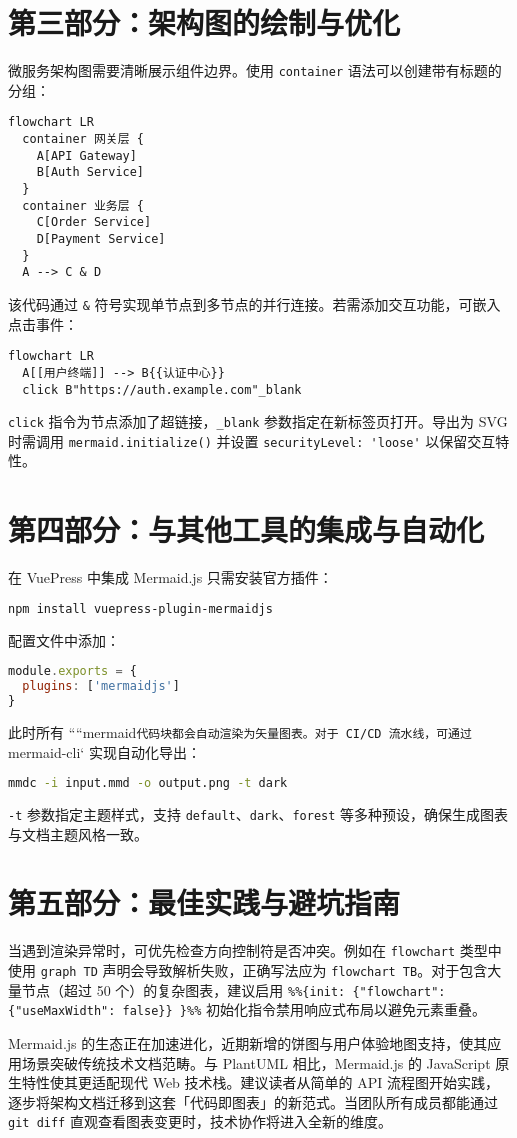 \chapter{第三部分：架构图的绘制与优化}
微服务架构图需要清晰展示组件边界。使用 \verb!container! 语法可以创建带有标题的分组：\par
\begin{lstlisting}[language=mermaid]
flowchart LR
  container 网关层 {
    A[API Gateway]
    B[Auth Service]
  }
  container 业务层 {
    C[Order Service]
    D[Payment Service]
  }
  A --> C & D
\end{lstlisting}
该代码通过 \verb!&! 符号实现单节点到多节点的并行连接。若需添加交互功能，可嵌入点击事件：\par
\begin{lstlisting}[language=mermaid]
flowchart LR
  A[[用户终端]] --> B{{认证中心}}
  click B"https://auth.example.com"_blank
\end{lstlisting}
\verb!click! 指令为节点添加了超链接，\verb!_blank! 参数指定在新标签页打开。导出为 SVG 时需调用 \verb!mermaid.initialize()! 并设置 \verb!securityLevel: 'loose'! 以保留交互特性。\par
\chapter{第四部分：与其他工具的集成与自动化}
在 VuePress 中集成 Mermaid.js 只需安装官方插件：\par
\begin{lstlisting}[language=bash]
npm install vuepress-plugin-mermaidjs
\end{lstlisting}
配置文件中添加：\par
\begin{lstlisting}[language=javascript]
module.exports = {
  plugins: ['mermaidjs']
}
\end{lstlisting}
此时所有 ````mermaid\verb!代码块都会自动渲染为矢量图表。对于 CI/CD 流水线，可通过!mermaid-cli` 实现自动化导出：\par
\begin{lstlisting}[language=bash]
mmdc -i input.mmd -o output.png -t dark
\end{lstlisting}
\verb!-t! 参数指定主题样式，支持 \verb!default!、\verb!dark!、\verb!forest! 等多种预设，确保生成图表与文档主题风格一致。\par
\chapter{第五部分：最佳实践与避坑指南}
当遇到渲染异常时，可优先检查方向控制符是否冲突。例如在 \verb!flowchart! 类型中使用 \verb!graph TD! 声明会导致解析失败，正确写法应为 \verb!flowchart TB!。对于包含大量节点（超过 50 个）的复杂图表，建议启用 \verb!%%{init: {"flowchart": {"useMaxWidth": false}} }%%! 初始化指令禁用响应式布局以避免元素重叠。\par
Mermaid.js 的生态正在加速进化，近期新增的饼图与用户体验地图支持，使其应用场景突破传统技术文档范畴。与 PlantUML 相比，Mermaid.js 的 JavaScript 原生特性使其更适配现代 Web 技术栈。建议读者从简单的 API 流程图开始实践，逐步将架构文档迁移到这套「代码即图表」的新范式。当团队所有成员都能通过 \verb!git diff! 直观查看图表变更时，技术协作将进入全新的维度。\par

